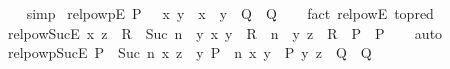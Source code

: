 \begin{isabellebody}
%
\isadelimproof
\ \ %
\endisadelimproof
%
\isatagproof
{}\isamarkupfalse%
\ simp%
\endisatagproof
{\isafoldproof}%
%
\isadelimproof
\isanewline
%
\endisadelimproof
\isanewline
{}\isamarkupfalse%
\ relpowp{\isacharunderscore}{\kern0pt}{}{\isacharunderscore}{\kern0pt}E{\isacharcolon}{\kern0pt}\ {\isachardoublequoteopen}{\isacharparenleft}{\kern0pt}P\ {\isacharcircum}{\kern0pt}{\isacharcircum}{\kern0pt}\ {}{\isacharparenright}{\kern0pt}\ x\ y\ {\isasymLongrightarrow}\ {\isacharparenleft}{\kern0pt}x\ {\isacharequal}{\kern0pt}\ y\ {\isasymLongrightarrow}\ Q{\isacharparenright}{\kern0pt}\ {\isasymLongrightarrow}\ Q{\isachardoublequoteclose}\isanewline
%
\isadelimproof
\ \ %
\endisadelimproof
%
\isatagproof
{}\isamarkupfalse%
\ {\isacharparenleft}{\kern0pt}fact\ relpow{\isacharunderscore}{\kern0pt}{}{\isacharunderscore}{\kern0pt}E\ {\isacharbrackleft}{\kern0pt}to{\isacharunderscore}{\kern0pt}pred{\isacharbrackright}{\kern0pt}{\isacharparenright}{\kern0pt}%
\endisatagproof
{\isafoldproof}%
%
\isadelimproof
\isanewline
%
\endisadelimproof
\isanewline
{}\isamarkupfalse%
\ relpow{\isacharunderscore}{\kern0pt}Suc{\isacharunderscore}{\kern0pt}E{\isacharcolon}{\kern0pt}\ {\isachardoublequoteopen}{\isacharparenleft}{\kern0pt}x{\isacharcomma}{\kern0pt}\ z{\isacharparenright}{\kern0pt}\ {\isasymin}\ R\ {\isacharcircum}{\kern0pt}{\isacharcircum}{\kern0pt}\ Suc\ n\ {\isasymLongrightarrow}\ {\isacharparenleft}{\kern0pt}{\isasymAnd}y{\isachardot}{\kern0pt}\ {\isacharparenleft}{\kern0pt}x{\isacharcomma}{\kern0pt}\ y{\isacharparenright}{\kern0pt}\ {\isasymin}\ R\ {\isacharcircum}{\kern0pt}{\isacharcircum}{\kern0pt}\ n\ {\isasymLongrightarrow}\ {\isacharparenleft}{\kern0pt}y{\isacharcomma}{\kern0pt}\ z{\isacharparenright}{\kern0pt}\ {\isasymin}\ R\ {\isasymLongrightarrow}\ P{\isacharparenright}{\kern0pt}\ {\isasymLongrightarrow}\ P{\isachardoublequoteclose}\isanewline
%
\isadelimproof
\ \ %
\endisadelimproof
%
\isatagproof
{}\isamarkupfalse%
\ auto%
\endisatagproof
{\isafoldproof}%
%
\isadelimproof
\isanewline
%
\endisadelimproof
\isanewline
{}\isamarkupfalse%
\ relpowp{\isacharunderscore}{\kern0pt}Suc{\isacharunderscore}{\kern0pt}E{\isacharcolon}{\kern0pt}\ {\isachardoublequoteopen}{\isacharparenleft}{\kern0pt}P\ {\isacharcircum}{\kern0pt}{\isacharcircum}{\kern0pt}\ Suc\ n{\isacharparenright}{\kern0pt}\ x\ z\ {\isasymLongrightarrow}\ {\isacharparenleft}{\kern0pt}{\isasymAnd}y{\isachardot}{\kern0pt}\ {\isacharparenleft}{\kern0pt}P\ {\isacharcircum}{\kern0pt}{\isacharcircum}{\kern0pt}\ n{\isacharparenright}{\kern0pt}\ x\ y\ {\isasymLongrightarrow}\ P\ y\ z\ {\isasymLongrightarrow}\ Q{\isacharparenright}{\kern0pt}\ {\isasymLongrightarrow}\ Q{\isachardoublequoteclose}\isanewline

\end{isabellebody}
